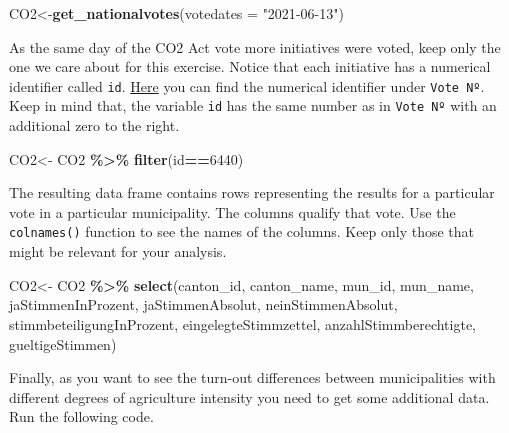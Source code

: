 \documentclass[
]{book}
\newenvironment{Shaded}{\begin{snugshade}}{\end{snugshade}}
\newcommand{\AttributeTok}[1]{\textcolor[rgb]{0.13,0.29,0.53}{#1}}
\newcommand{\DecValTok}[1]{\textcolor[rgb]{0.00,0.00,0.81}{#1}}
\newcommand{\FunctionTok}[1]{\textcolor[rgb]{0.13,0.29,0.53}{\textbf{#1}}}
\newcommand{\NormalTok}[1]{#1}
\newcommand{\OtherTok}[1]{\textcolor[rgb]{0.56,0.35,0.01}{#1}}
\newcommand{\SpecialCharTok}[1]{\textcolor[rgb]{0.81,0.36,0.00}{\textbf{#1}}}
\newcommand{\StringTok}[1]{\textcolor[rgb]{0.31,0.60,0.02}{#1}}
\begin{document}
\begin{Shaded}
\begin{Highlighting}[]
\NormalTok{CO2}\OtherTok{\textless{}{-}}\FunctionTok{get\_nationalvotes}\NormalTok{(}\AttributeTok{votedates =} \StringTok{"2021{-}06{-}13"}\NormalTok{)}
\end{Highlighting}
\end{Shaded}

As the same day of the CO2 Act vote more initiatives were voted, keep only the one we care about for this exercise. Notice that each initiative has a numerical identifier called \texttt{id}. \href{https://swissvotes.ch/vote/644.00}{Here} you can find the numerical identifier under \texttt{Vote\ Nº}. Keep in mind that, the variable \texttt{id} has the same number as in \texttt{Vote\ Nº} with an additional zero to the right.

\begin{Shaded}
\begin{Highlighting}[]
\NormalTok{CO2}\OtherTok{\textless{}{-}}\NormalTok{ CO2 }\SpecialCharTok{\%\textgreater{}\%}
  \FunctionTok{filter}\NormalTok{(id}\SpecialCharTok{==}\DecValTok{6440}\NormalTok{)}
\end{Highlighting}
\end{Shaded}

The resulting data frame contains rows representing the results for a particular vote in a particular municipality. The columns qualify that vote. Use the \texttt{colnames()} function to see the names of the columns. Keep only those that might be relevant for your analysis.

\begin{Shaded}
\begin{Highlighting}[]
\NormalTok{CO2}\OtherTok{\textless{}{-}}\NormalTok{ CO2 }\SpecialCharTok{\%\textgreater{}\%}
  \FunctionTok{select}\NormalTok{(canton\_id, canton\_name, mun\_id, mun\_name, jaStimmenInProzent, jaStimmenAbsolut, neinStimmenAbsolut, stimmbeteiligungInProzent, eingelegteStimmzettel, anzahlStimmberechtigte, gueltigeStimmen)}
\end{Highlighting}
\end{Shaded}

Finally, as you want to see the turn-out differences between municipalities with different degrees of agriculture intensity you need to get some additional data. Run the following code.
\end{document}
